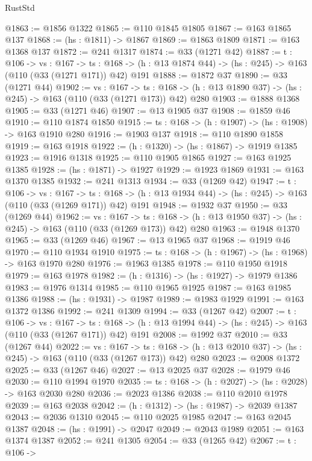 \begin{lexlean}{RustStd}
\begin{coremodule}
@1863 := @1856 @1322
@1865 := @110 @1845 @1805
@1867 := @163 @1865 @137
@1868 := (hs : @1811) -> @1867
@1869 := @1863 @1809
@1871 := @163 @1368 @137
@1872 := @241 @1317
@1874 := @33 (@1271 @42)
@1887 := {t : @106} ->
  {vs : @167} ->
  {ts : @168} -> (h : @13 @1874 @44) -> (hs : @245) -> @163 (@110 (@33 (@1271 @171)) @42) @191
@1888 := @1872 @37
@1890 := @33 (@1271 @44)
@1902 := {vs : @167} ->
  {ts : @168} -> (h : @13 @1890 @37) -> (hs : @245) -> @163 (@110 (@33 (@1271 @173)) @42) @280
@1903 := @1888 @1368
@1905 := @33 (@1271 @46)
@1907 := @13 @1905 @37
@1908 := @1859 @46
@1910 := @110 @1874 @1850
@1915 := {ts : @168} -> (h : @1907) -> (hs : @1908) -> @163 @1910 @280
@1916 := @1903 @137
@1918 := @110 @1890 @1858
@1919 := @163 @1918
@1922 := (h : @1320) -> (hs : @1867) -> @1919 @1385
@1923 := @1916 @1318
@1925 := @110 @1905 @1865
@1927 := @163 @1925 @1385
@1928 := (hs : @1871) -> @1927
@1929 := @1923 @1869
@1931 := @163 @1370 @1385
@1932 := @241 @1313
@1934 := @33 (@1269 @42)
@1947 := {t : @106} ->
  {vs : @167} ->
  {ts : @168} -> (h : @13 @1934 @44) -> (hs : @245) -> @163 (@110 (@33 (@1269 @171)) @42) @191
@1948 := @1932 @37
@1950 := @33 (@1269 @44)
@1962 := {vs : @167} ->
  {ts : @168} -> (h : @13 @1950 @37) -> (hs : @245) -> @163 (@110 (@33 (@1269 @173)) @42) @280
@1963 := @1948 @1370
@1965 := @33 (@1269 @46)
@1967 := @13 @1965 @37
@1968 := @1919 @46
@1970 := @110 @1934 @1910
@1975 := {ts : @168} -> (h : @1967) -> (hs : @1968) -> @163 @1970 @280
@1976 := @1963 @1385
@1978 := @110 @1950 @1918
@1979 := @163 @1978
@1982 := (h : @1316) -> (hs : @1927) -> @1979 @1386
@1983 := @1976 @1314
@1985 := @110 @1965 @1925
@1987 := @163 @1985 @1386
@1988 := (hs : @1931) -> @1987
@1989 := @1983 @1929
@1991 := @163 @1372 @1386
@1992 := @241 @1309
@1994 := @33 (@1267 @42)
@2007 := {t : @106} ->
  {vs : @167} ->
  {ts : @168} -> (h : @13 @1994 @44) -> (hs : @245) -> @163 (@110 (@33 (@1267 @171)) @42) @191
@2008 := @1992 @37
@2010 := @33 (@1267 @44)
@2022 := {vs : @167} ->
  {ts : @168} -> (h : @13 @2010 @37) -> (hs : @245) -> @163 (@110 (@33 (@1267 @173)) @42) @280
@2023 := @2008 @1372
@2025 := @33 (@1267 @46)
@2027 := @13 @2025 @37
@2028 := @1979 @46
@2030 := @110 @1994 @1970
@2035 := {ts : @168} -> (h : @2027) -> (hs : @2028) -> @163 @2030 @280
@2036 := @2023 @1386
@2038 := @110 @2010 @1978
@2039 := @163 @2038
@2042 := (h : @1312) -> (hs : @1987) -> @2039 @1387
@2043 := @2036 @1310
@2045 := @110 @2025 @1985
@2047 := @163 @2045 @1387
@2048 := (hs : @1991) -> @2047
@2049 := @2043 @1989
@2051 := @163 @1374 @1387
@2052 := @241 @1305
@2054 := @33 (@1265 @42)
@2067 := {t : @106} ->

\end{coremodule}
\end{lexlean}
